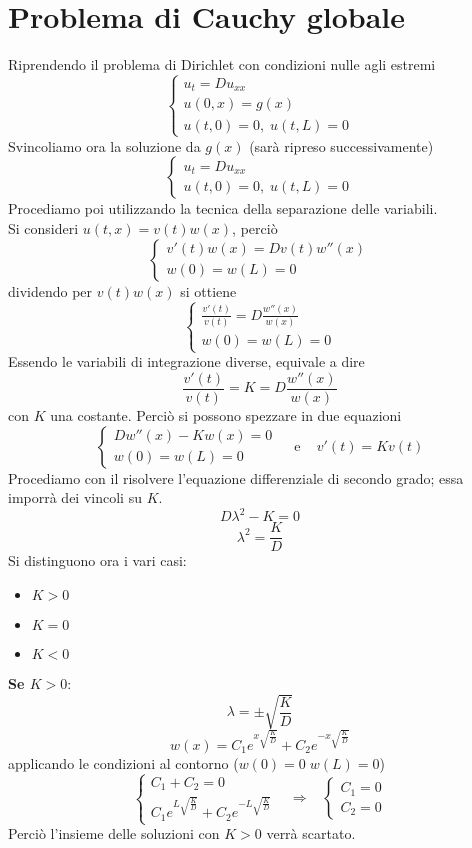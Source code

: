 \section{Problema di Cauchy globale}
Riprendendo il problema di Dirichlet con condizioni nulle agli estremi
\[
	\left\{
	\begin{array}{l}
		u_t=Du_{xx} \\
		u(0,x)=g(x) \\
		u(t,0)=0, \; u(t,L)=0
	\end{array}
	\right.
\]
Svincoliamo ora la soluzione da $g(x)$ (sar\`a ripreso successivamente)
\[
	\left\{
	\begin{array}{l}
		u_t=Du_{xx} \\
		u(t,0)=0, \; u(t,L)=0
	\end{array}
	\right.
\]
Procediamo poi utilizzando la tecnica della separazione delle variabili.\\
Si consideri $u(t,x)=v(t)w(x)$, perci\`o
\[
	\left\{
	\begin{array}{l}
		v'(t)w(x)=Dv(t)w''(x) \\
		w(0)=w(L)=0
	\end{array}
	\right.
\]
dividendo per $v(t)w(x)$ si ottiene
\[
	\left\{
	\begin{array}{l}
		\displaystyle{\frac{v'(t)}{v(t)}=D\frac{w''(x)}{w(x)} }\\
		w(0)=w(L)=0
	\end{array}
	\right.
\]
Essendo le variabili di integrazione diverse, equivale a dire
\[
	\frac{v'(t)}{v(t)}=K=D\frac{w''(x)}{w(x)}
\]
con $K$ una costante. Perci\`o si possono spezzare in due equazioni
\[
	\left\{
	\begin{array}{l}
		\displaystyle{D w''(x) - Kw(x) = 0 }\\
		w(0)=w(L)=0
	\end{array}
	\right.
	\;\;\;
	\text{ e }
	\;\;\;
	v'(t)=Kv(t)
\]
Procediamo con il risolvere l'equazione differenziale di secondo grado;
essa imporr\`a dei vincoli su $K$.
\[
	D\lambda^2-K=0
\]
\[
	\lambda^2=\frac{K}{D}
\]
Si distinguono ora i vari casi:
\begin{itemize}
	\item $K>0$
	\item $K=0$
	\item $K<0$
\end{itemize}

{\bf Se $K>0$}:
\[
	\lambda=\pm \sqrt{\frac{K}{D}}
\]
\[
	w(x)= C_1e^{x\sqrt{\frac{K}{D}}} + C_2e^{-x\sqrt{\frac{K}{D}}}
\]
applicando le condizioni al contorno ($w(0)=0 \; w(L)=0$)
\[
	\left\{
	\begin{array}{l}
		C_1+C_2=0 \\
		\displaystyle{C_1e^{L\sqrt{\frac{K}{D}}}
			+ C_2e^{-L\sqrt{\frac{K}{D}}}}
	\end{array}
	\right.
	\;\;\;
	\Rightarrow
	\;\;\;
	\left\{
	\begin{array}{l}
		C_1=0\\
		C_2=0
	\end{array}
	\right.
\]
Perci\`o l'insieme delle soluzioni con $K>0$ verr\`a scartato.

